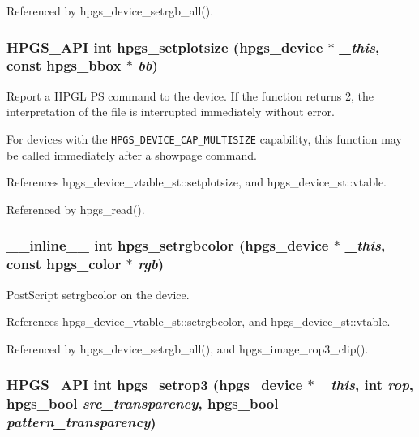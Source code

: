 Referenced by hpgs\_\-device\_\-setrgb\_\-all().
\subsubsection[hpgs\_\-setplotsize]{\setlength{\rightskip}{0pt plus 5cm}HPGS\_\-API int hpgs\_\-setplotsize ({\bf hpgs\_\-device} $\ast$ {\em \_\-this}, \/  const {\bf hpgs\_\-bbox} $\ast$ {\em bb})}\label{group__device_g9bab1b2e9a8a18abed30dd3a38f866ed}


Report a HPGL PS command to the device. If the function returns 2, the interpretation of the file is interrupted immediately without error.

For devices with the {\tt HPGS\_\-DEVICE\_\-CAP\_\-MULTISIZE} capability, this function may be called immediately after a showpage command. 

References hpgs\_\-device\_\-vtable\_\-st::setplotsize, and hpgs\_\-device\_\-st::vtable.

Referenced by hpgs\_\-read().
\subsubsection[hpgs\_\-setrgbcolor]{\setlength{\rightskip}{0pt plus 5cm}\_\-\_\-inline\_\-\_\- int hpgs\_\-setrgbcolor ({\bf hpgs\_\-device} $\ast$ {\em \_\-this}, \/  const {\bf hpgs\_\-color} $\ast$ {\em rgb})\hspace{0.3cm}{\tt  [static]}}\label{group__device_gd361763e4803ae55fff0432176dac3ef}


PostScript setrgbcolor on the device. 

References hpgs\_\-device\_\-vtable\_\-st::setrgbcolor, and hpgs\_\-device\_\-st::vtable.

Referenced by hpgs\_\-device\_\-setrgb\_\-all(), and hpgs\_\-image\_\-rop3\_\-clip().
\subsubsection[hpgs\_\-setrop3]{\setlength{\rightskip}{0pt plus 5cm}HPGS\_\-API int hpgs\_\-setrop3 ({\bf hpgs\_\-device} $\ast$ {\em \_\-this}, \/  int {\em rop}, \/  hpgs\_\-bool {\em src\_\-transparency}, \/  hpgs\_\-bool {\em pattern\_\-transparency})}\label{group__device_g81809156b70a1a85832f5af7d0f7e5b9}


